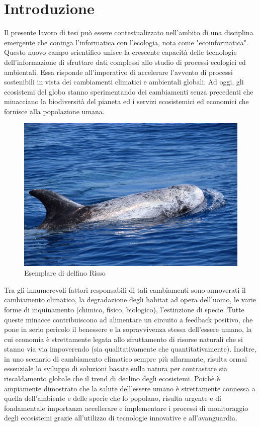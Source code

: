 \documentclass[a4paper,12pt]{report}
\begin{document}
\chapter{Introduzione}


  Il presente lavoro di tesi può essere contestualizzato nell’ambito di una disciplina emergente che coniuga l'informatica con
  l'ecologia, nota come "ecoinformatica". Questo nuovo campo scientifico unisce la crescente capacità delle tecnologie 
  dell’informazione di sfruttare dati complessi allo studio di processi ecologici ed ambientali. Essa risponde all'imperativo di accelerare
  l’avvento di processi sostenibili in vista dei cambiamenti climatici e ambientali
  globali.
  Ad oggi, gli ecosistemi del globo stanno sperimentando dei cambiamenti senza precedenti che minacciano la biodiversità del pianeta
  ed i servizi ecosistemici ed economici che fornisce alla popolazione umana. 
  \newpage
  \begin{figure}[H]
    \centering
    \includegraphics[width=\textwidth]{assets/images/intro/intro.jpeg}   
    \caption{Esemplare di delfino Risso}
  \end{figure}

  Tra gli innumerevoli fattori responsabili di tali cambiamenti sono annoverati
  il cambiamento climatico, la degradazione degli habitat ad opera dell'uomo, le varie forme di inquinamento (chimico, fisico, biologico), 
  l'estinzione di specie. Tutte queste minacce contribuiscono ad alimentare un circuito a feedback positivo, 
  che pone in serio pericolo il benessere e la sopravvivenza stessa dell'essere umano, la cui economia è strettamente
  legata allo sfruttamento di risorse naturali che si stanno via via impoverendo (sia qualitativamente che quantitativamente). Inoltre, 
  in uno scenario di cambiamento climatico sempre più allarmante, risulta ormai essenziale lo sviluppo di soluzioni basate sulla
  natura per contrastare sia riscaldamento globale che il trend di declino degli ecosistemi. Poichè è ampiamente dimostrato che la salute dell'essere umano è strettamente
  connessa a quella dell'ambiente e delle specie che lo popolano, risulta urgente e di fondamentale importanza accellerare e implementare i processi di
  monitoraggio degli ecosistemi grazie all'utilizzo di tecnologie innovative e all'avanguardia.
  
\end{document}
